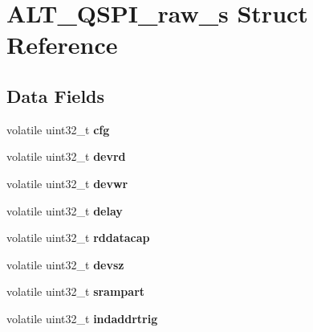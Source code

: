 \hypertarget{structALT__QSPI__raw__s}{}\section{A\+L\+T\+\_\+\+Q\+S\+P\+I\+\_\+raw\+\_\+s Struct Reference}
\label{structALT__QSPI__raw__s}
\subsection*{Data Fields}
\begin{DoxyCompactItemize}
\item 
\mbox{\label{structALT__QSPI__raw__s_ab5ce73b33abb8eb8a280238ae0fbbd83}} 
volatile uint32\+\_\+t {\bfseries cfg}
\item 
\mbox{\label{structALT__QSPI__raw__s_af7aaeaddd623df04985346aad66cf062}} 
volatile uint32\+\_\+t {\bfseries devrd}
\item 
\mbox{\label{structALT__QSPI__raw__s_aebe6ddef145c101eea4d65f2c89af926}} 
volatile uint32\+\_\+t {\bfseries devwr}
\item 
\mbox{\label{structALT__QSPI__raw__s_afb4194e15ebe1864d252f9d99d29cb76}} 
volatile uint32\+\_\+t {\bfseries delay}
\item 
\mbox{\label{structALT__QSPI__raw__s_a5a135e3c5bd418f43368ac2279baeca4}} 
volatile uint32\+\_\+t {\bfseries rddatacap}
\item 
\mbox{\label{structALT__QSPI__raw__s_acc5fdb2d56c6c72e3cdb1783dd687eda}} 
volatile uint32\+\_\+t {\bfseries devsz}
\item 
\mbox{\label{structALT__QSPI__raw__s_a010d38d81ab2fb67a87809805609e525}} 
volatile uint32\+\_\+t {\bfseries srampart}
\item 
\mbox{\label{structALT__QSPI__raw__s_a3e7ccebb14d2de46506c1033dd06dbaa}} 
volatile uint32\+\_\+t {\bfseries indaddrtrig}
\item 
\mbox{\label{structALT__QSPI__raw__s_a5368905518e0f2bd47f369d1bb9312ee}} 

\end{DoxyCompactItemize}
